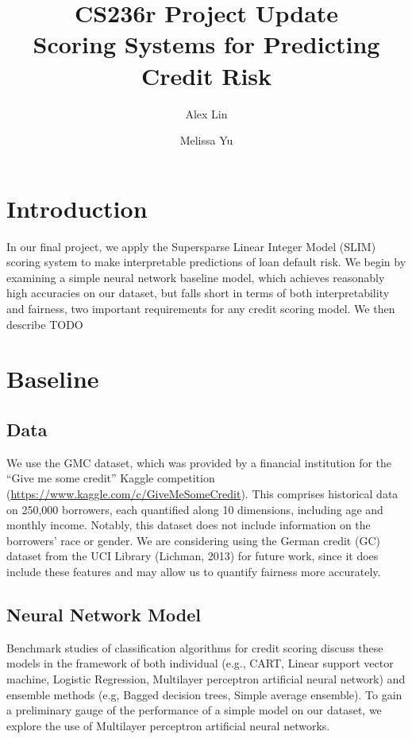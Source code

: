 \documentclass[11pt, margin=1in]{article}
\begin{document}
	
\title{CS236r Project Update \\ Scoring Systems for Predicting Credit Risk}
\author{Alex Lin \and Melissa Yu}
\date{}
\maketitle

\section{Introduction}
In our final project, we apply the  Supersparse Linear Integer Model (SLIM) scoring system to make interpretable predictions of loan default risk. We begin by examining a simple neural network baseline model, which achieves reasonably high accuracies on our dataset, but falls short in terms of both interpretability and fairness, two important requirements for any credit scoring model. We then describe TODO

\section{Baseline}

\subsection{Data} 
We use the GMC dataset, which was provided by a financial institution for the ``Give me some credit'' Kaggle competition (\url{https://www.kaggle.com/c/GiveMeSomeCredit}). This comprises historical data on 250,000 borrowers, each quantified along 10 dimensions, including age and monthly income. Notably, this dataset does not include information on the borrowers' race or gender. We are considering using the German credit (GC) dataset from the UCI Library (Lichman, 2013) for future work, since it does include these features and may allow us to quantify fairness more accurately.

\subsection{Neural Network Model} 
Benchmark studies of classification algorithms for credit scoring discuss these models in the framework of both individual (e.g., CART, Linear support vector machine, Logistic Regression, Multilayer perceptron artificial neural network) and ensemble methods (e.g, Bagged decision trees, Simple average ensemble). To gain a preliminary gauge of the performance of a simple model on our dataset, we explore the use of Multilayer perceptron artificial neural networks.
\end{document}
